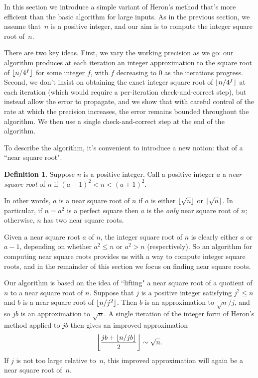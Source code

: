 \documentclass[a4paper]{article}
\DeclarePairedDelimiter\floor{\lfloor}{\rfloor}
\DeclarePairedDelimiter\ceil{\lceil}{\rceil}
\theoremstyle{plain}
\theoremstyle{definition}
\newtheorem{definition}[theorem]{Definition}
\begin{document}
In this section we introduce a simple variant of Heron's method that's
more efficient than the basic algorithm for large inputs. As in
the previous section, we assume that~$n$ is a positive integer, and our aim
is to compute the integer square root of~$n$.

There are two key ideas. First, we vary the working precision as we go: our
algorithm produces at each iteration an integer approximation to the square
root of $\floor{n/4^f}$ for some integer $f$, with $f$ decreasing to $0$ as the
iterations progress. Second, we don't insist on obtaining the exact integer
square root of $\floor{n/4^f}$ at each iteration (which would require a
per-iteration check-and-correct step), but instead allow the error to
propagate, and we show that with careful control of the rate at which the
precision increases, the error remains bounded throughout the algorithm. We
then use a single check-and-correct step at the end of the algorithm.

To describe the algorithm, it's convenient to introduce a new notion: that of a
``near square root".

\begin{definition}
  Suppose $n$ is a positive integer. Call a positive integer $a$ a
  \emph{near square root} of $n$ if $(a - 1)^2 < n < (a + 1)^2$.
\end{definition}

In other words, $a$ is a near square root of $n$ if $a$ is either $\floor{\sqrt
n}$ or $\ceil{\sqrt n}$. In particular, if $n = a^2$ is a perfect square then
$a$ is the \emph{only} near square root of $n$; otherwise, $n$ has two near
square roots.

Given a near square root $a$ of $n$, the integer square root of $n$ is clearly
either $a$ or $a-1$, depending on whether $a^2 \le n$ or $a^2 > n$
(respectively). So an algorithm for computing near square roots provides us
with a way to compute integer square roots, and in the remainder of this
section we focus on finding near square roots.

Our algorithm is based on the idea of ``lifting" a near square root of a
quotient of $n$ to a near square root of $n$. Suppose that $j$ is a positive
integer satisfying $j^2 \le n$ and $b$ is a near square root of $\floor{n /
j^2}$. Then $b$ is an approximation to $\sqrt n / j$, and so $jb$ is an
approximation to $\sqrt n$. A single iteration of the integer form of Heron's
method applied to $jb$ then gives an improved approximation
$$\floor*{\frac{jb + \floor{n / jb}}2} \sim \sqrt n.$$ If $j$ is not too large
relative to~$n$, this improved approximation will again be a near square root
of~$n$.
\end{document}
